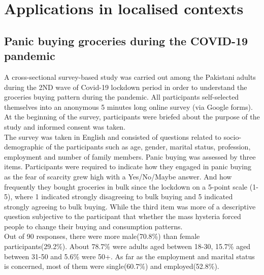 \documentclass[runningheads]{llncs}
\begin{document}
\section{Applications in localised contexts}
\subsection{Panic buying groceries during the COVID-19 pandemic}
A cross-sectional survey-based study was carried out among the Pakistani adults during the 2ND wave of Covid-19 lockdown period in order to understand the groceries buying pattern during the pandemic. All participants self-selected themselves into an anonymous 5 minutes long online survey (via Google forms). At the beginning of the survey, participants were briefed about the purpose of the study and informed consent was taken. \\
The survey was taken in English and consisted of questions related to socio-demographic of the participants such as age, gender, marital status, profession, employment and number of family members. Panic buying was assessed by three items. Participants were required to indicate how they engaged in panic buying as the fear of scarcity grew high with a Yes/No/Maybe answer. And how frequently they bought groceries in bulk since the lockdown on a 5-point scale (1-5), where 1 indicated strongly disagreeing to bulk buying and 5 indicated strongly agreeing to bulk buying. While the third item was more of a descriptive question subjective to the participant that whether the mass hysteria forced people to change their buying and consumption patterns.\\
Out of 90 responses, there were more male(70.8\%) than female participants(29.2\%). About 78.7\% were adults aged between 18-30, 15.7\% aged between 31-50 and 5.6\% were 50+. As far as the employment and marital status is concerned, most of them were single(60.7\%) and employed(52.8\%).
\end{document}
